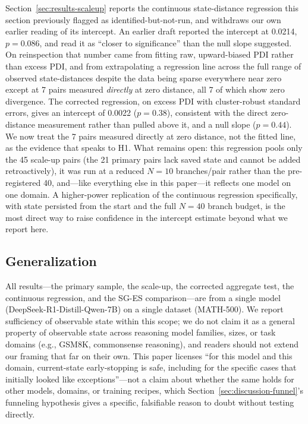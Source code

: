\documentclass{article}
\begin{document}
Section~\ref{sec:results-scaleup} reports the continuous state-distance regression this section previously flagged as identified-but-not-run, and withdraws our own earlier reading of its intercept. An earlier draft reported the intercept at 0.0214, $p=0.086$, and read it as ``closer to significance'' than the null slope suggested. On reinspection that number came from fitting raw, upward-biased PDI rather than excess PDI, and from extrapolating a regression line across the full range of observed state-distances despite the data being sparse everywhere near zero except at 7 pairs measured \emph{directly} at zero distance, all 7 of which show zero divergence. The corrected regression, on excess PDI with cluster-robust standard errors, gives an intercept of 0.0022 ($p=0.38$), consistent with the direct zero-distance measurement rather than pulled above it, and a null slope ($p=0.44$). We now treat the 7 pairs measured directly at zero distance, not the fitted line, as the evidence that speaks to H1. What remains open: this regression pools only the 45 scale-up pairs (the 21 primary pairs lack saved state and cannot be added retroactively), it was run at a reduced $N=10$ branches/pair rather than the pre-registered 40, and---like everything else in this paper---it reflects one model on one domain. A higher-power replication of the continuous regression specifically, with state persisted from the start and the full $N=40$ branch budget, is the most direct way to raise confidence in the intercept estimate beyond what we report here.

\subsection{Generalization}
\label{sec:lim-general}

All results---the primary sample, the scale-up, the corrected aggregate test, the continuous regression, and the SG-ES comparison---are from a single model (DeepSeek-R1-Distill-Qwen-7B) on a single dataset (MATH-500). We report sufficiency of observable state within this scope; we do not claim it as a general property of observable state across reasoning model families, sizes, or task domains (e.g., GSM8K, commonsense reasoning), and readers should not extend our framing that far on their own. This paper licenses ``for this model and this domain, current-state early-stopping is safe, including for the specific cases that initially looked like exceptions''---not a claim about whether the same holds for other models, domains, or training recipes, which Section~\ref{sec:discussion-funnel}'s funneling hypothesis gives a specific, falsifiable reason to doubt without testing directly.
\end{document}
